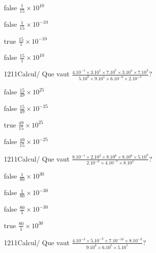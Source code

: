 \documentclass[11pt]{article}
\begin{document}
            \begin{reponses}
                \item[false] $\frac{1}{15}\times 10^{10}$
                \item[false] $\frac{1}{15}\times 10^{-10}$
                \item[true] $\frac{15}{1}\times 10^{-10}$
                \item[false] $\frac{15}{1}\times 10^{10}$
            \end{reponses}
            
            \begin{question}{1211}{Calcul}{}{/}
                Que vaut $\frac{4.10^{-1}\times 3.10^{1}\times 7.10^{7}\times 3.10^{4}\times 7.10^{3}}{5.10^{0}\times 9.10^{5}\times 6.10^{-9}\times 2.10^{-7}}$?
            \end{question}
            
            \begin{reponses}
                \item[false] $\frac{15}{49}\times 10^{25}$
                \item[false] $\frac{15}{49}\times 10^{-25}$
                \item[true] $\frac{49}{15}\times 10^{25}$
                \item[false] $\frac{49}{15}\times 10^{-25}$
            \end{reponses}
            
            \begin{question}{1211}{Calcul}{}{/}
                Que vaut $\frac{8.10^{-1}\times 2.10^{2}\times 8.10^{6}\times 8.10^{6}\times 5.10^{8}}{2.10^{-6}\times 4.10^{-7}\times 8.10^{4}}$?
            \end{question}
            
            \begin{reponses}
                \item[false] $\frac{1}{80}\times 10^{30}$
                \item[false] $\frac{1}{80}\times 10^{-30}$
                \item[false] $\frac{80}{1}\times 10^{-30}$
                \item[true] $\frac{80}{1}\times 10^{30}$
            \end{reponses}
            
            \begin{question}{1211}{Calcul}{}{/}
                Que vaut $\frac{4.10^{-3}\times 5.10^{-3}\times 7.10^{-10}\times 8.10^{-9}}{9.10^{8}\times 6.10^{7}\times 5.10^{1}}$?
            \end{question}
            
\end{document}
